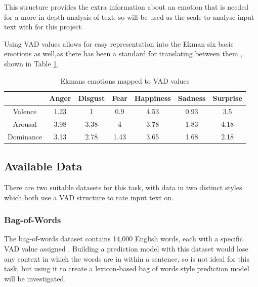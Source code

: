 This structure provides the extra information about an emotion that is needed for a more in depth analysis of text, so will be used as the scale to analyse input text with for this project.

Using VAD values allows for easy representation into the Ekman six basic emotions as well,as there has been a standard for translating between them \cite{VADMapping}, shown in Table \ref{ekmansTable}.


\begin{table}[ht]
\caption{Ekmans emotions mapped to VAD values \cite{VADMapping}}
\centering
\begin{tabular}{ |c|c|c|c|c|c|c| } 
 \hline
  & Anger & Disgust & Fear & Happiness & Sadness & Surprise \\ 
 \hline                        
 Valence & 1.23 & 1 & 0.9 & 4.53 & 0.93 & 3.5\\ 
 Arousal & 3.98 & 3.38 & 4 & 3.78 & 1.83 & 4.18\\ 
 Dominance & 3.13 & 2.78 & 1.43 & 3.65 & 1.68 & 2.18\\ 
 \hline
\end{tabular}
\label{ekmansTable}
\end{table}


\subsection{Available Data}
There are two suitable datasets for this task, with data in two distinct styles which both use a VAD structure to rate input text on.



\subsubsection{Bag-of-Words}

The bag-of-words dataset contains 14,000 English words, each with a specific VAD value assigned \cite{wordsData}. Building a prediction model with this dataset would lose any context in which the words are in within a sentence, so is not ideal for this task, but using it to create a lexicon-based bag of words style prediction model will be investigated.


